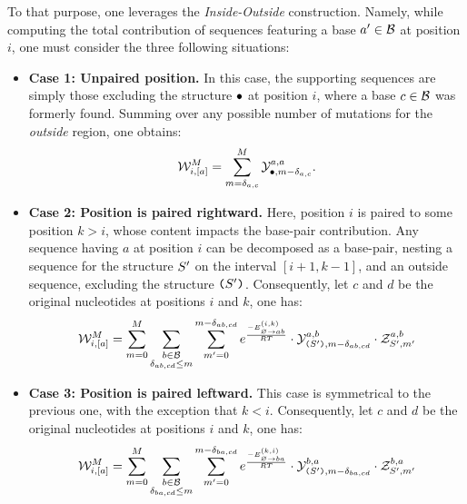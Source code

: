 To that purpose, one leverages the \emph{Inside-Outside} construction. Namely, while computing the total contribution of sequences featuring a base $a'\in\mathcal{B}$ at position $i$, one must consider the three following situations:
\begin{itemize}
\item {\bf Case 1: Unpaired position.} In this case, the supporting sequences are simply those excluding the structure $\bullet$ at position $i$, where a base $c\in\mathcal{B}$ was formerly found. Summing over any possible number of mutations for the \emph{outside} region, one obtains:
\begin{equation}
 \mathcal{W}^M_{\substack{i, [a]}} =  \sum_{m=\delta_{a,c}}^{M}
			\mathcal{Y}_{\bullet, m-\delta_{a,c}}^{a,a}.
\label{eq:combine_A}
\end{equation}
\item {\bf Case 2: Position is paired rightward.} Here, position $i$ is paired to some position $k>i$, whose content impacts the base-pair contribution. Any sequence having $a$ at position $i$ can be decomposed as a base-pair, nesting a sequence for the structure $S'$ on the interval $[i+1,k-1]$, and an outside sequence, excluding the structure $\text{\tt(}S'\text{\tt )}$.
Consequently, let $c$ and $d$ be the original nucleotides at positions $i$ and $k$, one has:
\begin{equation}
 \mathcal{W}^M_{\substack{i, [a]}} =  
			\sum_{m=0}^{M}
			\sum_{\substack{b\in \mathcal{B}\\\delta_{ab,cd}\leq m}}
			\sum_{m'=0}^{m-\delta_{ab,cd}}
     	 e^{\frac{-E^{(i,k)}_{{\varnothing}\to{ab}}}{RT}}
			\cdot\mathcal{Y}_{\text{\tt(}S'\text{\tt )}, m-\delta_{ab,cd}}^{a,b}
			\cdot\mathcal{Z}_{S', m'}^{a,b}
\label{eq:combine_B}
\end{equation}
\item {\bf Case 3: Position is paired leftward.} This case is symmetrical to the previous one, with the exception that $k<i$.
Consequently, let $c$ and $d$ be the original nucleotides at positions $i$ and $k$, one has:
\begin{equation}
 \mathcal{W}^M_{\substack{i, [a]}} =  
			\sum_{m=0}^{M}
			\sum_{\substack{b\in \mathcal{B}\\\delta_{ba,cd}\leq m}}
			\sum_{m'=0}^{m-\delta_{ba,cd}}
     	 e^{\frac{-E^{(k,i)}_{{\varnothing}\to{ba}}}{RT}}
			\cdot\mathcal{Y}_{\text{\tt(}S'\text{\tt )}, m-\delta_{ba,cd}}^{b,a}
			\cdot\mathcal{Z}_{S', m'}^{b,a}
\label{eq:combine_C}
\end{equation}
\end{itemize}

